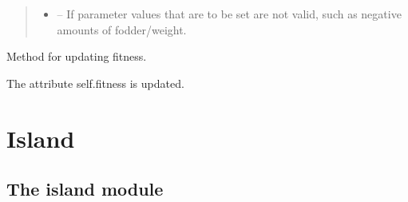 \documentclass[a4paper,10pt,english]{sphinxmanual}
\begin{document}
\begin{fulllineitems}
\begin{fulllineitems}
\begin{quote}
\begin{description}
\begin{itemize}
\item {} 
 -- If parameter values that are to be set are not valid, such as
negative amounts of fodder/weight.

\end{itemize}

\end{description}\end{quote}

\end{fulllineitems}


\begin{fulllineitems}
\label{\detokenize{animals:biosim.animals.Herbivore.update_fitness}}
Method for updating fitness.

The attribute self.fitness is updated.

\end{fulllineitems}


\end{fulllineitems}



\chapter{Island}
\label{\detokenize{island:island}}\label{\detokenize{island::doc}}

\section{The island module}
\label{\detokenize{island:the-island-module}}\label{\detokenize{island:module-biosim.island}}
\end{document}
